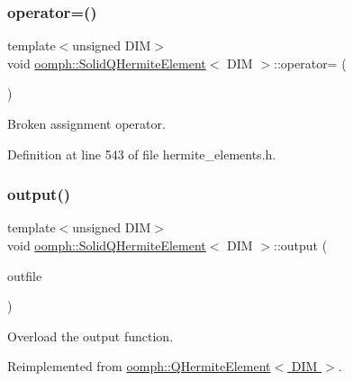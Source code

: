\subsubsection{\texorpdfstring{operator=()}{operator=()}}
{\footnotesize\ttfamily template$<$unsigned D\+IM$>$ \\
void \hyperlink{classoomph_1_1SolidQHermiteElement}{oomph\+::\+Solid\+Q\+Hermite\+Element}$<$ D\+IM $>$\+::operator= (\begin{DoxyParamCaption}\item[{const \hyperlink{classoomph_1_1SolidQHermiteElement}{Solid\+Q\+Hermite\+Element}$<$ D\+IM $>$ \&}]{ }\end{DoxyParamCaption})\hspace{0.3cm}{\ttfamily [inline]}}



Broken assignment operator. 



Definition at line 543 of file hermite\+\_\+elements.\+h.

\mbox{\label{classoomph_1_1SolidQHermiteElement_a6459f239b585ae575d779f58f70bae46}} 
\subsubsection{\texorpdfstring{output()}{output()}\hspace{0.1cm}{\footnotesize\ttfamily [1/8]}}
{\footnotesize\ttfamily template$<$unsigned D\+IM$>$ \\
void \hyperlink{classoomph_1_1SolidQHermiteElement}{oomph\+::\+Solid\+Q\+Hermite\+Element}$<$ D\+IM $>$\+::output (\begin{DoxyParamCaption}\item[{std\+::ostream \&}]{outfile }\end{DoxyParamCaption})\hspace{0.3cm}{\ttfamily [virtual]}}



Overload the output function. 



Reimplemented from \hyperlink{classoomph_1_1QHermiteElement_aed2b691a0b8effb35840561b5112a3af}{oomph\+::\+Q\+Hermite\+Element$<$ D\+I\+M $>$}.



